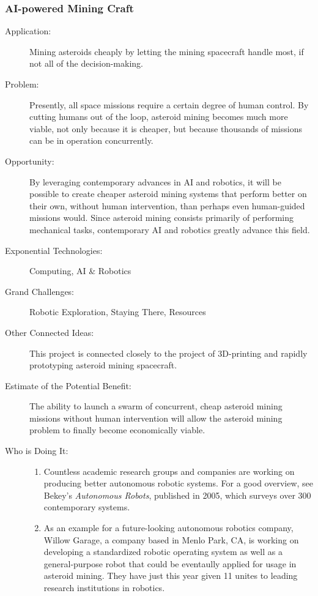  \subsubsection{AI-powered Mining Craft}
\begin{description}


\item[Application:]

Mining asteroids cheaply by letting the mining spacecraft handle most,
if not all of the decision-making.


\item[Problem:]

Presently, all space missions require a certain degree of human control.
By cutting humans out of the loop, asteroid mining becomes much more
viable, not only because it is cheaper, but because thousands of missions
can be in operation concurrently.


\item[Opportunity:]

By leveraging contemporary advances in AI and robotics, it will be
possible to create cheaper asteroid mining systems that perform better
on their own, without human intervention, than perhaps even human-guided
missions would. Since asteroid mining consists primarily of performing
mechanical tasks, contemporary AI and robotics greatly advance this
field.


\item[Exponential Technologies:]

Computing, AI \& Robotics


\item[Grand Challenges:]

Robotic Exploration, Staying There, Resources


\item[Other Connected Ideas:]

This project is connected closely to the project of 3D-printing and
rapidly prototyping asteroid mining spacecraft.


\item[Estimate of the Potential Benefit:]

The ability to launch a swarm of concurrent, cheap asteroid mining
missions without human intervention will allow the asteroid mining
problem to finally become economically viable.


\item[Who is Doing It:]
\hfill
\begin{enumerate}
\item Countless academic research groups and companies are working on producing
better autonomous robotic systems. For a good overview, see Bekey's
\emph{Autonomous Robots}, published in 2005, which surveys over 300
contemporary systems\cite{bekey}.
\item As an example for a future-looking autonomous robotics company, Willow
Garage, a company based in Menlo Park, CA, is working on developing
a standardized robotic operating system as well as a general-purpose
robot that could be eventaully applied for usage in asteroid mining.
They have just this year given 11 unites to leading research institutions
in robotics\cite{willow}.
\end{enumerate}


\end{description}
